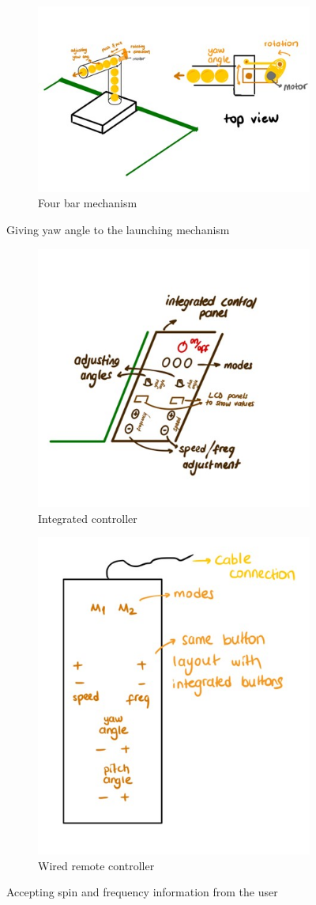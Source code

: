 \documentclass[12pt]{report}
\begin{document}
\begin{appendices}
\begin{figure}[H]
\begin{subfigure}{.5\textwidth}
  \centering
  \includegraphics[width=.4\linewidth]{fourbaryaw.jpg}
  \caption{Four bar mechanism}
  \label{fig:fourbar_yaw}
\end{subfigure}%

\caption{Giving yaw angle to the launching mechanism  }
\label{fig:yaw}
\end{figure}

\begin{figure}[H]
\centering
\begin{subfigure}{.3\textwidth}
  \centering
  \includegraphics[width=.3\linewidth]{integratedcontroller.jpg}
  \caption{Integrated controller}
  \label{fig:integrated}
\end{subfigure}%
\begin{subfigure}{.3\textwidth}
  \centering
  \includegraphics[width=.3\linewidth]{wiredremote.jpg}
  \caption{Wired remote controller}
  \label{fig:wired}
\end{subfigure}

\caption{Accepting spin and frequency information from the user}
\label{fig:accept_spin_freq}
\end{figure}


\end{appendices}
\end{document}
